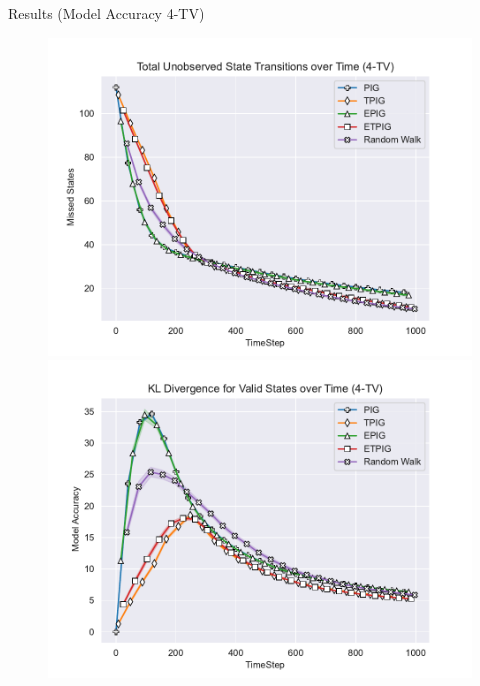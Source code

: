 	
	\begin{frame}[fragile]{Results (Model Accuracy 4-TV)}
		\begin{figure}
			\begin{center}
				\includegraphics[scale=0.40]{"../images/Missed_States_4-TV.pdf"}
				\includegraphics[scale=0.40]{"../images/Model_Accuracy_4-TV.pdf"}
			\end{center}
		\end{figure}
	\end{frame}
	
	
